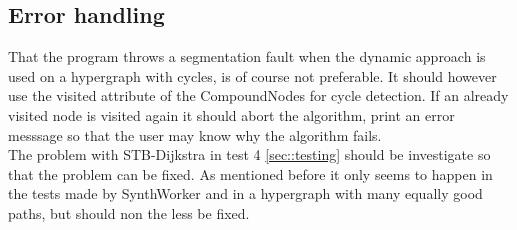 \documentclass[a4paper,10pt,titlepage]{paper}
\begin{document}
\subsection{Error handling}
That the program throws a segmentation fault when the dynamic approach is used on a hypergraph with cycles, is of course not preferable. It should however use the visited attribute of the CompoundNodes for cycle detection. If an already visited node is visited again it should abort the algorithm, print an error messsage so that the user may know why the algorithm fails.\\
The problem with STB-Dijkstra in test 4 \ref{sec::testing} should be investigate so that the problem can be fixed. As mentioned before it only seems to happen in the tests made by SynthWorker and in a hypergraph with many equally good paths, but should non the less be fixed.
\end{document}
